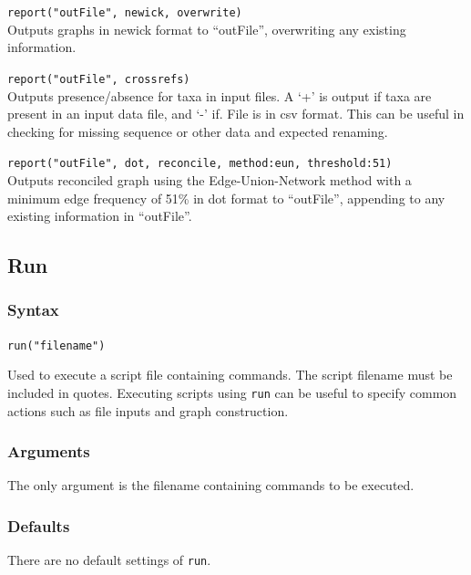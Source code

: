 	\begin{example}
		\item{\texttt{report("outFile", newick, overwrite)}\\ Outputs graphs in newick format to 
		``outFile'', overwriting any existing information.}
		
		\item{\texttt{report("outFile", crossrefs)}\\ Outputs presence/absence for taxa in input files. 
		A `+' is output if taxa are present in an input data file, and `-' if. File is in csv format. This 
		can be useful in checking for missing sequence or other data and expected renaming.}
		
		\item{\texttt{report("outFile", dot, reconcile, method:eun, threshold:51)}\\ Outputs reconciled 
		graph using the Edge-Union-Network method with a minimum edge frequency of 51\% in 
		dot format to ``outFile'', appending to any existing information in ``outFile''.}
	\end{example}

\subsection{Run}
	\subsubsection{Syntax}
		\texttt{run("filename")}
		
	\begin{phygdescription}
		{Used to execute a \phyg script file containing commands. The script filename must be 
		included in quotes. 
		Executing scripts using \texttt{run} can be useful to specify common actions such as file inputs 
		and graph construction. }
	\end{phygdescription}
	
	\subsubsection{Arguments}
		The only argument is the filename containing commands to be executed.
		
	\subsubsection{Defaults}
		There are no default settings of \texttt{run}. 
	

